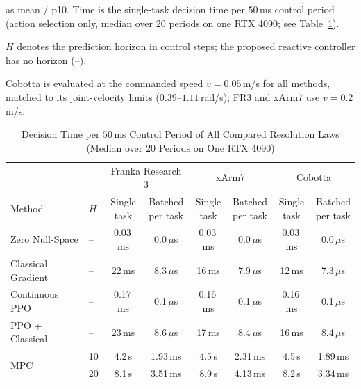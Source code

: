 \documentclass[journal, twoside]{IEEEtran}
\begin{document}
\begin{table}[!htbp]
\begin{threeparttable}
\begin{tablenotes}
    as mean / p10. Time is the single-task decision time per $50$\,ms
    control period (action selection only, median over $20$ periods on
    one RTX 4090; see Table~\ref{tab:latency}).
    \item[Note 2] $H$ denotes the prediction horizon in control steps;
    the proposed reactive controller has no horizon (--).
    \item[Note 3] Cobotta is evaluated at the commanded speed
    $v=0.05$\,m/s for all methods, matched to its joint-velocity limits
    ($0.39$--$1.11$\,rad/s); FR3 and xArm7 use $v=0.2$\,m/s.
\end{tablenotes}
\end{threeparttable}
\end{table}

\begin{table}[!htbp]
\centering
\caption{Decision Time per $50$\,ms Control Period of All Compared
Resolution Laws (Median over $20$ Periods on One RTX 4090)}
\label{tab:latency}
\begin{threeparttable}
\footnotesize
\setlength{\tabcolsep}{4.5pt}
\begin{tabular}{llcccccc}
\toprule
& & \multicolumn{2}{c}{Franka Research 3}
& \multicolumn{2}{c}{xArm7}
& \multicolumn{2}{c}{Cobotta} \\
\cmidrule(lr){3-4} \cmidrule(lr){5-6} \cmidrule(lr){7-8}
Method & $H$
& \shortstack{Single\\task} & \shortstack{Batched\\per task}
& \shortstack{Single\\task} & \shortstack{Batched\\per task}
& \shortstack{Single\\task} & \shortstack{Batched\\per task} \\
\midrule
Zero Null-Space & -- & 0.03\,ms & 0.0\,$\mu$s & 0.03\,ms & 0.0\,$\mu$s & 0.03\,ms & 0.0\,$\mu$s \\
Classical Gradient & -- & 22\,ms & 8.3\,$\mu$s & 16\,ms & 7.9\,$\mu$s & 12\,ms & 7.3\,$\mu$s \\
Continuous PPO & -- & 0.17\,ms & 0.1\,$\mu$s & 0.16\,ms & 0.1\,$\mu$s & 0.16\,ms & 0.1\,$\mu$s \\
PPO + Classical & -- & 23\,ms & 8.6\,$\mu$s & 17\,ms & 8.4\,$\mu$s & 16\,ms & 8.4\,$\mu$s \\
\midrule
\multirow{3}{*}{MPC} & 10 & 4.2\,s & 1.93\,ms & 4.5\,s & 2.31\,ms & 4.5\,s & 1.89\,ms \\
  & 20 & 8.1\,s & 3.51\,ms & 8.9\,s & 4.13\,ms & 8.2\,s & 3.34\,ms \\

\end{tabular}
\end{threeparttable}
\end{table}
\end{document}
